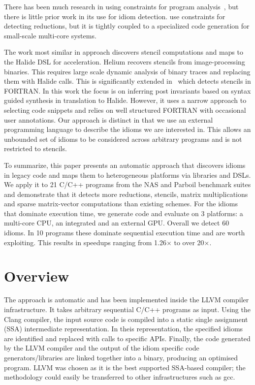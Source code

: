     There has been much research in using constraints for program
    analysis~\cite{nielson2015principles}, but there is little prior work in its use
    for idiom detection.
    \cite{ginsbach2017discovery} use constraints for detecting
    reductions, but it is tightly coupled to a specialized code generation
    for small-scale multi-core systems.

    The work most similar in approach discovers stencil computations and maps to
    the Halide DSL for acceleration.
    Helium \cite{Mendis2015Helium} recovers stencils from image-processing
    binaries.
    This requires large scale dynamic analysis of binary traces and replacing
    them with Halide calls. 
    This is significantly extended in~\cite{Kamil2016Verified} which detects
    stencils in FORTRAN.
    In this work the focus is on inferring post invariants based on syntax
    guided synthesis in translation to Halide.
    However, it uses a narrow approach to selecting code snippets and relies on
    well structured FORTRAN with occasional user annotations.
    Our approach is distinct in that we use an external  programming language to
    describe the idioms we are interested in.
    This allows an unbounded set of idioms  to be considered across arbitrary
    programs and is not restricted to stencils. 

    To summarize, this paper presents an automatic approach that discovers
    idioms in legacy code and maps them to heterogeneous platforms via libraries
    and DSLs.
    We apply it to 21 C/C++ programs from the NAS and Parboil benchmark suites
    and demonstrate that it detects more reductions, stencils, matrix
    multiplications and sparse matrix-vector computations than existing schemes.
    For the idioms that dominate execution time, we generate code and evaluate
    on 3 platforms: a multi-core CPU, an integrated and an external GPU.
    Overall we detect 60 idioms.
    In 10 programs these dominate sequential execution time and are worth
    exploiting.
    This results in speedups ranging from 1.26$\times$ to over 20$\times$.

\section{Overview}

    The approach is automatic and has been implemented inside the LLVM compiler
    infrastructure.
    It takes arbitrary sequential C/C++ programs as input.
    Using the Clang compiler, the input source code is compiled into a static
    single assignment (SSA) intermediate representation.
    In theis representation, the specified idioms are identified and replaced
    with calls to specific APIs.
    Finally, the code generated by the LLVM compiler and the output of the idiom
    specific code generators/libraries are linked together into a binary,
    producing an optimised program.
    LLVM was chosen as it is the best supported SSA-based compiler;
    the methodology could easily be transferred to other infrastructures such as
    gcc.

